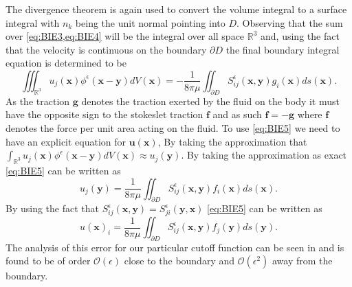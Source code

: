 The divergence theorem is again used to convert the volume integral to a surface integral with $n_k$ being the unit normal pointing into $D$. Observing that the sum over \cref{eq:BIE3,eq:BIE4} will be the integral over all space $\mathbb{R}^{3}$ and, using the fact that the velocity is continuous on the boundary $\partial D$ the final boundary integral equation is determined to be
\begin{equation}
  \label{eq:BIE5}
    \iiint_{\mathbb{R}^{3}} u_{j}(\bm{x}) \phi^{\epsilon}\left(\bm{x}-\bm{y}\right) d V(\bm{x})=-\frac{1}{8 \pi \mu} \iint_{\partial D} S_{i j}^{\epsilon}\left(\bm{x}, \bm{y}\right) g_{i}(\bm{x}) d s(\bm{x}).
\end{equation}
As the traction $\bm{g}$ denotes the traction exerted by the fluid on the body it must have the opposite sign to the stokeslet traction $\bm{f}$ and as such $\bm{f} = -\bm{g}$ where $\bm{f}$ denotes the force per unit area acting on the fluid. To use \cref{eq:BIE5} we need to have an explicit equation for $\bm{u}(\bm{x})$, By taking the approximation that $\int_{\mathbb{R}^{3}} u_{j}(\bm{x}) \phi^{\epsilon}\left(\bm{x}-\bm{y}\right) d V(\bm{x}) \approx u_j(\bm{y})$. By taking the approximation as exact \cref{eq:BIE5} can be written as
\begin{equation}
    u_j(\bm{y}) = \frac{1}{8 \pi \mu} \iint_{\partial D} S_{i j}^{\epsilon}\left(\bm{x}, \bm{y}\right) f_{i}(\bm{x}) d s(\bm{x}).
\end{equation}
By using the fact that $S_{i j}^{\epsilon}\left(\bm{x}, \bm{y}\right) = S_{j i}^{\epsilon}\left(\bm{y}, \bm{x}\right)$ \cref{eq:BIE5} can be written as 
\begin{equation}
  \label{eq:BIE}
    u(\bm{x})_i=\frac{1}{8 \pi \mu} \iint_{\partial D} S_{i j}^{\epsilon}\left(\bm{x}, \bm{y}\right) f_{j}(\bm{y}) d s(\bm{y}).
\end{equation}
The analysis of this error for our particular cutoff function can be seen in \cite{Cortez2005} and is found to be of order $\mathcal{O}(\epsilon)$ close to the boundary and $\mathcal{O}(\epsilon^2)$ away from the boundary.

